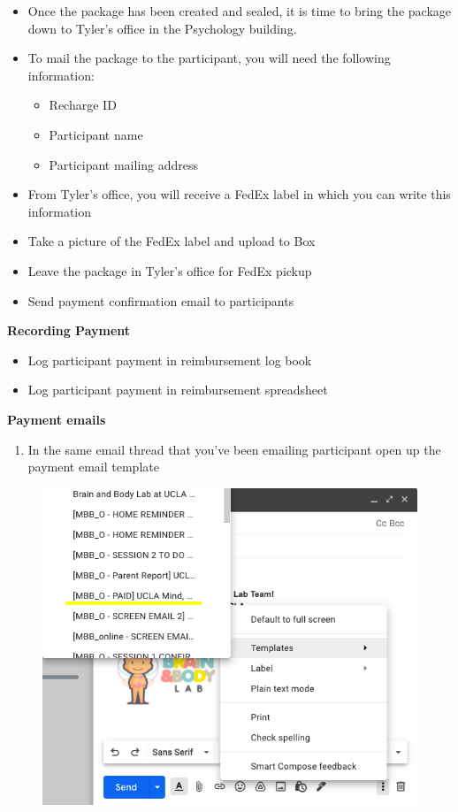 \documentclass[]{book}
\providecommand{\tightlist}{%
  \setlength{\itemsep}{0pt}\setlength{\parskip}{0pt}}
\begin{document}
\begin{itemize}
\tightlist
\item
  Once the package has been created and sealed, it is time to bring the package down to Tyler's office in the Psychology building.
\item
  To mail the package to the participant, you will need the following information:

  \begin{itemize}
  \tightlist
  \item
    Recharge ID
  \item
    Participant name
  \item
    Participant mailing address
  \end{itemize}
\item
  From Tyler's office, you will receive a FedEx label in which you can write this information
\item
  Take a picture of the FedEx label and upload to Box
\item
  Leave the package in Tyler's office for FedEx pickup
\item
  Send payment confirmation email to participants
\end{itemize}

\textbf{Recording Payment}

\begin{itemize}
\tightlist
\item
  Log participant payment in reimbursement log book
\item
  Log participant payment in reimbursement spreadsheet
\end{itemize}

\textbf{Payment emails}

\begin{enumerate}
\def\labelenumi{\arabic{enumi}.}
\tightlist
\item
  In the same email thread that you've been emailing participant open up the payment email template
\end{enumerate}

\begin{figure}
\centering
\includegraphics{images/payment/a.png}
\caption{}
\end{figure}
\end{document}
